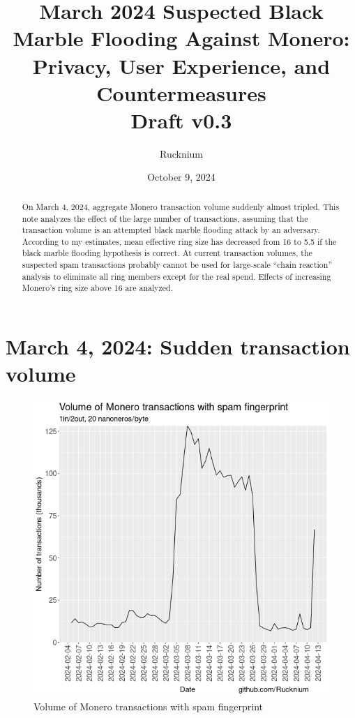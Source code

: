 \documentclass[usletter,11pt,english,openany]{article}
\begin{document}
\title{March 2024 Suspected Black Marble Flooding Against Monero:
Privacy, User Experience, and Countermeasures\\\vspace{.3cm}
\large Draft v0.3\vspace{-.715cm}}
\author{Rucknium }
\date{October 9, 2024}
\maketitle
\begin{abstract}
On March 4, 2024, aggregate Monero transaction volume suddenly almost
tripled. This note analyzes the effect of the large number of transactions,
assuming that the transaction volume is an attempted black marble
flooding attack by an adversary. According to my estimates, mean effective
ring size has decreased from 16 to 5.5 if the black marble flooding
hypothesis is correct. At current transaction volumes, the suspected
spam transactions probably cannot be used for large-scale ``chain
reaction'' analysis to eliminate all ring members except for the
real spend. Effects of increasing Monero's ring size above 16 are
analyzed.
\end{abstract}

\section{March 4, 2024: Sudden transaction volume }

\begin{figure}[H]
\caption{Volume of Monero transactions with spam fingerprint}
\label{fig-spam-tx-volume}
\centering{}\includegraphics[scale=0.5]{images/spam-fingerprint-tx-volume}
\end{figure}
\end{document}
